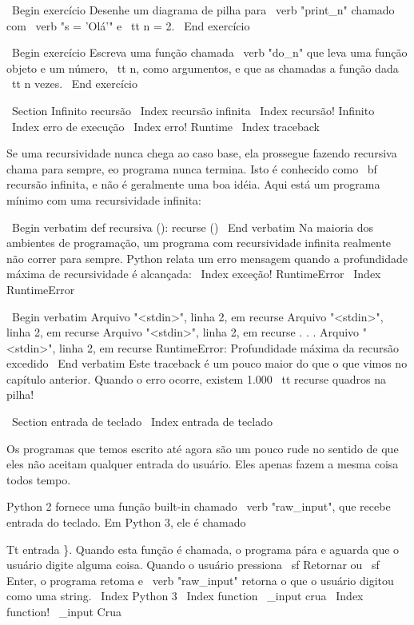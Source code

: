 \documentclass[10pt]{book}
\begin{document}
\begin {itemize}
{{\ Begin {} exercício
Desenhe um diagrama de pilha para \ verb "print_n" chamado com
\ verb "s = 'Olá'" e {\ tt n = 2}.
\ End {} exercício

\ Begin {} exercício
Escreva uma função chamada \ verb "do_n" que leva uma função
objeto e um número, {\ tt n}, como argumentos, e que as chamadas
a função dada {\ tt n} vezes.
\ End {} exercício



\ Section {Infinito recursão}
\ Index {recursão infinita}
\ Index {recursão! Infinito}
\ Index {erro de execução}
\ Index {erro! Runtime}
\ Index {} traceback

Se uma recursividade nunca chega ao caso base, ela prossegue fazendo
recursiva chama para sempre, eo programa nunca termina. Isto é
conhecido como {\ bf recursão infinita}, e não é geralmente
uma boa idéia. Aqui está um programa mínimo com uma recursividade infinita:

\ Begin {verbatim}
def recursiva ():
    recurse ()
\ End {verbatim}
%
Na maioria dos ambientes de programação, um programa com recursividade infinita
realmente não correr para sempre. Python relata um erro
mensagem quando a profundidade máxima de recursividade é alcançada:
\ Index {exceção! RuntimeError}
\ Index {} RuntimeError

\ Begin {verbatim}
  Arquivo "<stdin>", linha 2, em recurse
  Arquivo "<stdin>", linha 2, em recurse
  Arquivo "<stdin>", linha 2, em recurse
                  .   
                  .
                  .
  Arquivo "<stdin>", linha 2, em recurse
RuntimeError: Profundidade máxima da recursão excedido
\ End {verbatim}
%
Este traceback é um pouco maior do que o que vimos no
capítulo anterior. Quando o erro ocorre, existem 1.000
{\ tt recurse} quadros na pilha!


\ Section {entrada de teclado}
\ Index {entrada de teclado}

Os programas que temos escrito até agora são um pouco rude no sentido de que
eles não aceitam qualquer entrada do usuário. Eles apenas fazem a mesma coisa todos
tempo.

Python 2 fornece uma função built-in chamado \ verb "raw_input", que recebe
entrada do teclado. Em Python 3, ele é chamado
  {Tt entrada \}. Quando esta função é chamada, o programa pára e
aguarda que o usuário digite alguma coisa. Quando o usuário pressiona {\ sf
  Retornar} ou {\ sf Enter}, o programa retoma e \ verb "raw_input"
retorna o que o usuário digitou como uma string.
\ Index {Python 3}
\ Index {function \ _input crua}
\ Index {function! \ _input Crua}

}}}
\end{itemize}
\end{document}
